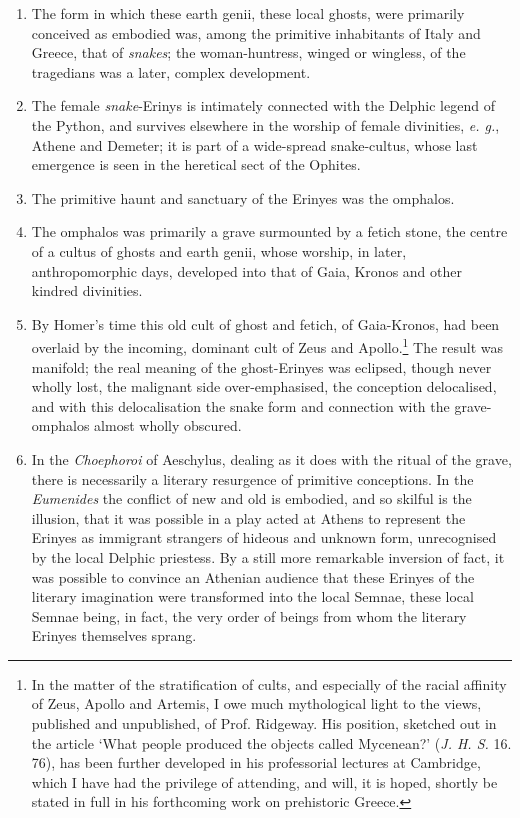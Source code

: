 \documentclass[a4paper, 11pt, oneside, polutonikogreek, english]{article}
\begin{document}
\begin{enumerate}
    \item The form in which these earth genii, these local ghosts, were primarily conceived as embodied was, among the primitive inhabitants of Italy and Greece, that of \emph{snakes}; the woman-huntress, winged or wingless, of the tragedians was a later, complex development.

    \item The female \emph{snake}-Erinys is intimately connected with the Delphic legend of the Python, and survives elsewhere in the worship of female divinities, \emph{e. g.}, Athene and Demeter; it is part of a wide-spread snake-cultus, whose last emergence is seen in the heretical sect of the Ophites.

    \item The primitive haunt and sanctuary of the Erinyes was the omphalos.

    \item The omphalos was primarily a grave surmounted by a fetich stone, the centre of a cultus of ghosts and earth genii, whose worship, in later, anthropomorphic days, developed into that of Gaia, Kronos and other kindred divinities.

    \item By Homer's time this old cult of ghost and fetich, of Gaia-Kronos, had been overlaid by the incoming, dominant cult of Zeus and Apollo.\footnote{In the matter of the stratification of cults, and especially of the racial affinity of Zeus, Apollo and Artemis, I owe much mythological light to the views, published and unpublished, of Prof. Ridgeway. His position, sketched out in the article `What people produced the objects called Mycenean?' (\emph{J. H. S.} 16. 76), has been further developed in his professorial lectures at Cambridge, which I have had the privilege of attending, and will, it is hoped, shortly be stated in full in his forthcoming work on prehistoric Greece.} The result was manifold; the real meaning of the ghost-Erinyes was eclipsed, though never wholly lost, the malignant side over-emphasised, the conception delocalised, and with this delocalisation the snake form and connection with the grave-omphalos almost wholly obscured.

    \item In the \emph{Choephoroi} of Aeschylus, dealing as it does with the ritual of the grave, there is necessarily a literary resurgence of primitive conceptions. In the \emph{Eumenides} the conflict of new and old is embodied, and so skilful is the illusion, that it was possible in a play acted at Athens to represent the Erinyes as immigrant strangers of hideous and unknown form, unrecognised by the local Delphic priestess. By a still more remarkable inversion of fact, it was possible to convince an Athenian audience that these Erinyes of the literary imagination were transformed into the local Semnae, these local Semnae being, in fact, the very order of beings from whom the literary Erinyes themselves sprang.
\end{enumerate}
\clearpage
\end{document}

